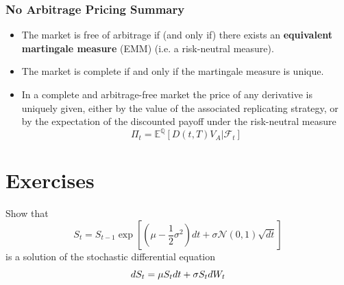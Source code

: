 \documentclass[12pt,a4paper]{book}
\begin{document}
\subsubsection{No Arbitrage Pricing Summary}
\begin{itemize}
\item The market is free of arbitrage if (and only if) there exists an \textbf{equivalent martingale measure} (EMM) (i.e. a risk-neutral measure).
\item The market is complete if and only if the martingale measure is unique.
\item In a complete and arbitrage-free market the price of any derivative is uniquely given, either by the value of the associated replicating strategy, or by the expectation of the discounted payoff under the risk-neutral measure
\begin{equation}
\Pi_t = \mathbb{E}^{\mathbb{Q}}[D(t,T)V_A|\mathcal{F}_t]
\label{eq:risk_neutral_pricing}
\end{equation}
\end{itemize}

\section*{Exercises}
\begin{exercise}[subtitle={Geometric Brownian Motion}]
\label{ex:gbm}
Show that 
\begin{equation*}
S_t = S_{t-1}\exp\left[\left(\mu-\frac{1}{2}\sigma^2\right)dt + \sigma\mathcal{N}(0,1)\sqrt{dt}\right] 
\end{equation*}
is a solution of the stochastic differential equation
\begin{equation*}
dS_t = \mu S_t dt + \sigma S_t dW_t \\
\end{equation*}
\end{exercise}
\end{document}

